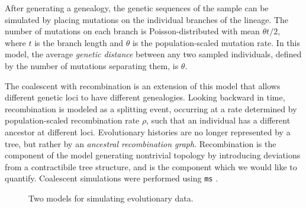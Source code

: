 After generating a genealogy, the genetic sequences of the sample can be simulated by placing mutations on the individual branches of the lineage.
The number of mutations on each branch is Poisson-distributed with mean $\theta t / 2$, where $t$ is the branch length and $\theta$ is the population-scaled mutation rate.
In this model, the average \emph{genetic distance} between any two sampled individuals, defined by the number of mutations separating them, is $\theta$.

The coalescent with recombination is an extension of this model that allows different genetic loci to have different genealogies.
Looking backward in time, recombination is modeled as a splitting event, occurring at a rate determined by population-scaled recombination rate $\rho$, such that an individual has a different ancestor at different loci.
Evolutionary histories are no longer represented by a tree, but rather by an \emph{ancestral recombination graph}.
Recombination is the component of the model generating nontrivial topology by introducing deviations from a contractibile tree structure, and is the component which we would like to quantify.
Coalescent simulations were performed using \texttt{ms} \cite{Hudson:2002}.

\begin{figure}
\centering
    \caption[Two models for simulating evolutionary data]{Two models for simulating evolutionary data.}
\end{figure}

